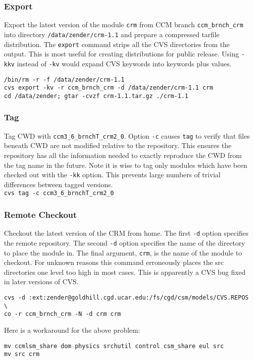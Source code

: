 \documentclass[12pt,twoside]{article}
\begin{document}
\subsubsection[Export]{Export}
Export the latest version of the module \verb'crm' from CCM
branch \verb'ccm_brnch_crm' into directory
\verb'/data/zender/crm-1.1' and prepare a compressed tarfile
distribution.  
The \verb'export' command strips all the CVS directories from the
output.  
This is most useful for creating distributions for public release. 
Using \verb'-kkv' instead of \verb'-kv' would expand CVS keywords into
keywords plus values. 
\begin{verbatim}
/bin/rm -r -f /data/zender/crm-1.1
cvs export -kv -r ccm_brnch_crm -d /data/zender/crm-1.1 crm
cd /data/zender; gtar -cvzf crm-1.1.tar.gz ./crm-1.1
\end{verbatim}

\subsubsection[Tag]{Tag}
Tag CWD with \verb'ccm3_6_brnchT_crm2_0'. 
Option \verb'-c' causes \verb'tag' to verify that files beneath CWD
are not modified relative to the repository. 
This ensures the repository has all the information needed to exactly 
reproduce the CWD from the tag name in the future. 
Note it is wise to tag only modules which have been checked out  
with the \verb'-kk' option.
This prevents large numbers of trivial differences between tagged
versions.\\  
\verb'cvs tag -c ccm3_6_brnchT_crm2_0'

\subsubsection[Remote Checkout]{Remote Checkout}
Checkout the latest version of the CRM from home. 
The first \verb'-d' option specifies the remote repository.
The second \verb'-d' option specifies the name of the directory to place the
module in.
The final argument, \verb'crm', is the name of the module to checkout.
For unknown reasons this command erroneously places the src directories one
level too high in most cases.
This is apparently a CVS bug fixed in later versions of CVS.
\begin{verbatim}
cvs -d :ext:zender@goldhill.cgd.ucar.edu:/fs/cgd/csm/models/CVS.REPOS \
co -r ccm_brnch_crm -N -d crm crm
\end{verbatim}
Here is a workaround for the above problem:
\begin{verbatim}
mv ccmlsm_share dom physics srchutil control csm_share eul src
mv src crm
\end{verbatim}
\end{document}
